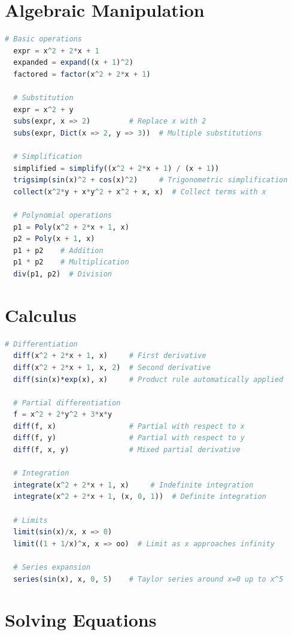 \documentclass[12pt,answers]{book}
\begin{document}
\section{Algebraic Manipulation}

\begin{lstlisting}[language=Julia]
  # Basic operations
  expr = x^2 + 2*x + 1
  expanded = expand((x + 1)^2)
  factored = factor(x^2 + 2*x + 1)

  # Substitution
  expr = x^2 + y
  subs(expr, x => 2)         # Replace x with 2
  subs(expr, Dict(x => 2, y => 3))  # Multiple substitutions

  # Simplification
  simplified = simplify((x^2 + 2*x + 1) / (x + 1))
  trigsimp(sin(x)^2 + cos(x)^2)     # Trigonometric simplification
  collect(x^2*y + x*y^2 + x^2 + x, x)  # Collect terms with x

  # Polynomial operations
  p1 = Poly(x^2 + 2*x + 1, x)
  p2 = Poly(x + 1, x)
  p1 + p2    # Addition
  p1 * p2    # Multiplication
  div(p1, p2)  # Division
\end{lstlisting}

\section{Calculus}

\begin{lstlisting}[language=Julia]
  # Differentiation
  diff(x^2 + 2*x + 1, x)     # First derivative
  diff(x^2 + 2*x + 1, x, 2)  # Second derivative
  diff(sin(x)*exp(x), x)     # Product rule automatically applied

  # Partial differentiation
  f = x^2 + 2*y^2 + 3*x*y
  diff(f, x)                 # Partial with respect to x
  diff(f, y)                 # Partial with respect to y
  diff(f, x, y)              # Mixed partial derivative

  # Integration
  integrate(x^2 + 2*x + 1, x)     # Indefinite integration
  integrate(x^2 + 2*x + 1, (x, 0, 1))  # Definite integration

  # Limits
  limit(sin(x)/x, x => 0)
  limit((1 + 1/x)^x, x => oo)  # Limit as x approaches infinity

  # Series expansion
  series(sin(x), x, 0, 5)    # Taylor series around x=0 up to x^5
\end{lstlisting}

\section{Solving Equations}
\end{document}
